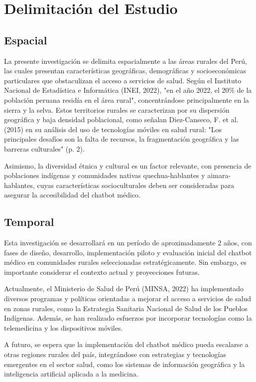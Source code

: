 \section{Delimitación del Estudio}

\subsection{Espacial}
La presente investigación se delimita espacialmente a las áreas rurales del Perú, las cuales presentan características geográficas, demográficas y socioeconómicas particulares que obstaculizan el acceso a servicios de salud. Según el Instituto Nacional de Estadística e Informática (INEI, 2022), "en el año 2022, el 20\% de la población peruana residía en el área rural", concentrándose principalmente en la sierra y la selva. Estos territorios rurales se caracterizan por su dispersión geográfica y baja densidad poblacional, como señalan Diez-Canseco, F. et al. (2015) en su análisis del uso de tecnologías móviles en salud rural: "Los principales desafíos son la falta de recursos, la fragmentación geográfica y las barreras culturales" (p. 2).

Asimismo, la diversidad étnica y cultural es un factor relevante, con presencia de poblaciones indígenas y comunidades nativas quechua-hablantes y aimara-hablantes, cuyas características socioculturales deben ser consideradas para asegurar la accesibilidad del chatbot médico.

\subsection{Temporal}
Esta investigación se desarrollará en un período de aproximadamente 2 años, con fases de diseño, desarrollo, implementación piloto y evaluación inicial del chatbot médico en comunidades rurales seleccionadas estratégicamente. Sin embargo, es importante considerar el contexto actual y proyecciones futuras.

Actualmente, el Ministerio de Salud de Perú (MINSA, 2022) ha implementado diversos programas y políticas orientadas a mejorar el acceso a servicios de salud en zonas rurales, como la Estrategia Sanitaria Nacional de Salud de los Pueblos Indígenas. Además, se han realizado esfuerzos por incorporar tecnologías como la telemedicina y los dispositivos móviles.

A futuro, se espera que la implementación del chatbot médico pueda escalarse a otras regiones rurales del país, integrándose con estrategias y tecnologías emergentes en el sector salud, como los sistemas de información geográfica y la inteligencia artificial aplicada a la medicina.

